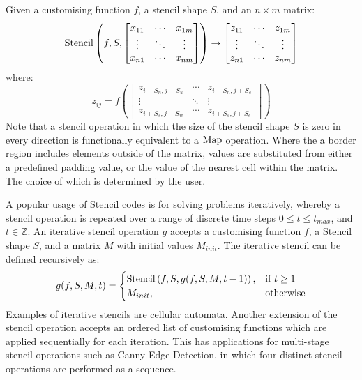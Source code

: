 Given a customising function $f$, a stencil shape $S$, and an
$n \times m$ matrix:
%
\begin{equation}
\operatorname*{Stencil} \left( f, S,
\begin{bmatrix}
  x_{11} & \cdots & x_{1m} \\
  \vdots & \ddots & \vdots \\
  x_{n1} & \cdots & x_{nm}
\end{bmatrix} \right)
\to
\begin{bmatrix}
  z_{11} & \cdots & z_{1m} \\
  \vdots & \ddots & \vdots \\
  z_{n1} & \cdots & z_{nm}
\end{bmatrix}
\end{equation}
%
where:
%
\begin{equation}
z_{ij} = f \left(
\begin{bmatrix}
  z_{i-S_n,j-S_w} & \cdots & z_{i-S_n,j+S_e} \\
  \vdots & \ddots & \vdots \\
  z_{i+S_s,j-S_w} & \cdots & z_{i+S_s,j+S_e}
\end{bmatrix} \right)
\end{equation}
%
Note that a stencil operation in which the size of the stencil shape
$S$ is zero in every direction is functionally equivalent to a $\operatorname*{Map}$
operation. Where the a border region includes elements outside of the
matrix, values are substituted from either a predefined padding value,
or the value of the nearest cell within the matrix. The choice of
which is determined by the user.

A popular usage of Stencil codes is for solving problems iteratively,
whereby a stencil operation is repeated over a range of discrete time
steps $0 \le t \le t_{max}$, and $t \in \mathbb{Z}$. An iterative
stencil operation $g$ accepts a customising function $f$, a Stencil
shape $S$, and a matrix $M$ with initial values $M_{init}$. The
iterative stencil can be defined recursively as:
%
\begin{equation}
g(f, S, M, t) =
\begin{cases}
  \operatorname*{Stencil} \left( f, S, g(f, S, M, t-1) \right),& \text{if } t \geq 1\\
  M_{init}, & \text{otherwise}
\end{cases}
\end{equation}
%
Examples of iterative stencils are cellular automata. Another
extension of the stencil operation accepts an ordered list of
customising functions which are applied sequentially for each
iteration. This has applications for multi-stage stencil operations
such as Canny Edge Detection, in which four distinct stencil
operations are performed as a sequence.


